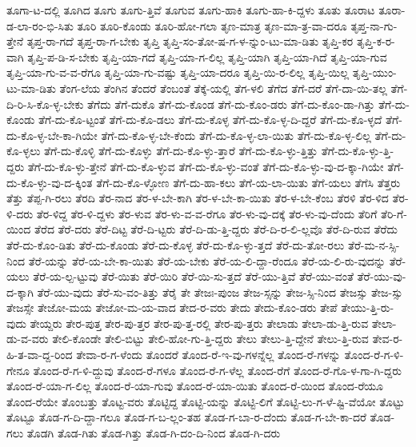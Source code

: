 {ತೂಗಾ-ಟ-ದಲ್ಲಿ
ತೂಗಿದ
ತೂಗು
ತೂಗು-ತ್ತಿವೆ
ತೂಗುವ
ತೂಗು-ಹಾಕಿ
ತೂಗು-ಹಾ-ಕಿ-ದ್ದಳು
ತೂತು
ತೂರಾಟ
ತೂರಾ-ಡ-ಲಾ-ರಂ-ಭಿ-ಸಿತು
ತೂರಿ
ತೂರಿ-ಕೊಂಡು
ತೂರಿ-ಹೋ-ಗಲಾ
ತೃಣ-ಮಾತ್ರ
ತೃಣ-ಮಾ-ತ್ರ-ವಾ-ದರೂ
ತೃಪ್ತ-ನಾ-ಗು-ತ್ತೇನೆ
ತೃಪ್ತ-ರಾ-ಗದೆ
ತೃಪ್ತ-ರಾ-ಗ-ಬೇಕು
ತೃಪ್ತಿ
ತೃಪ್ತಿ-ಸಂ-ತೋ-ಷ-ಗ-ಳ-ನ್ನುಂ-ಟು-ಮಾ-ಡಿತು
ತೃಪ್ತಿ-ಕರ
ತೃಪ್ತಿ-ಕ-ರ-ವಾಗಿ
ತೃಪ್ತಿ-ಪ-ಡಿ-ಸ-ಬೇಕು
ತೃಪ್ತಿ-ಯಾ-ಗದೆ
ತೃಪ್ತಿ-ಯಾ-ಗ-ಲಿಲ್ಲ
ತೃಪ್ತಿ-ಯಾಗಿ
ತೃಪ್ತಿ-ಯಾ-ಗಿದೆ
ತೃಪ್ತಿ-ಯಾ-ಗುವ
ತೃಪ್ತಿ-ಯಾ-ಗು-ವ-ವ-ರೆಗೂ
ತೃಪ್ತಿ-ಯಾ-ಗು-ವಷ್ಟು
ತೃಪ್ತಿ-ಯಾ-ದರೂ
ತೃಪ್ತಿ-ಯಿ-ರ-ಲಿಲ್ಲ
ತೃಪ್ತಿ-ಯಿಲ್ಲ
ತೃಪ್ತಿ-ಯುಂ-ಟು-ಮಾ-ಡಿತು
ತೆಂಗ-ಲೆಯ
ತೆಂಗಿನ
ತೆಂದರೆ
ತೆಂಬಂತೆ
ತೆಕ್ಕೆ-ಯಲ್ಲಿ
ತೆಗ-ಳಲಿ
ತೆಗೆದ
ತೆಗೆ-ದರೆ
ತೆಗೆ-ದಾ-ಯಿ-ತಲ್ಲ
ತೆಗೆ-ದಿ-ರಿ-ಸಿ-ಕೊ-ಳ್ಳ-ಬೇಕು
ತೆಗೆದು
ತೆಗೆ-ದುಕೊ
ತೆಗೆ-ದು-ಕೊಂಡ
ತೆಗೆ-ದು-ಕೊಂ-ಡರು
ತೆಗೆ-ದು-ಕೊಂ-ಡಾ-ಗಿತ್ತು
ತೆಗೆ-ದು-ಕೊಂಡು
ತೆಗೆ-ದು-ಕೊ-ಟ್ಟಂತೆ
ತೆಗೆ-ದು-ಕೊ-ಡಲು
ತೆಗೆ-ದು-ಕೊಳ್ಳ
ತೆಗೆ-ದು-ಕೊ-ಳ್ಳ-ದಿ-ದ್ದರೆ
ತೆಗೆ-ದು-ಕೊ-ಳ್ಳದೆ
ತೆಗೆ-ದು-ಕೊ-ಳ್ಳ-ಬೇ-ಕಾ-ಗಿಯೇ
ತೆಗೆ-ದು-ಕೊ-ಳ್ಳ-ಬೇ-ಕೆಂದು
ತೆಗೆ-ದು-ಕೊ-ಳ್ಳ-ಲಾ-ಯಿತು
ತೆಗೆ-ದು-ಕೊ-ಳ್ಳ-ಲಿಲ್ಲ
ತೆಗೆ-ದು-ಕೊ-ಳ್ಳಲು
ತೆಗೆ-ದು-ಕೊಳ್ಳಿ
ತೆಗೆ-ದು-ಕೊಳ್ಳು
ತೆಗೆ-ದು-ಕೊ-ಳ್ಳು-ತ್ತಾರೆ
ತೆಗೆ-ದು-ಕೊ-ಳ್ಳು-ತ್ತಿತ್ತು
ತೆಗೆ-ದು-ಕೊ-ಳ್ಳು-ತ್ತಿ-ದ್ದರು
ತೆಗೆ-ದು-ಕೊ-ಳ್ಳು-ತ್ತೇನೆ
ತೆಗೆ-ದು-ಕೊ-ಳ್ಳುವ
ತೆಗೆ-ದು-ಕೊ-ಳ್ಳು-ವಂತೆ
ತೆಗೆ-ದು-ಕೊ-ಳ್ಳು-ವು-ದ-ಕ್ಕಾ-ಗಿಯೇ
ತೆಗೆ-ದು-ಕೊ-ಳ್ಳು-ವು-ದ-ಕ್ಕಿಂತ
ತೆಗೆ-ದು-ಕೊ-ಳ್ಳೋಣ
ತೆಗೆ-ದು-ಹಾ-ಕಲು
ತೆಗೆ-ಯ-ಲಾ-ಯಿತು
ತೆಗೆ-ಯಲು
ತೆಗೆಸಿ
ತೆತ್ತರು
ತೆತ್ತು
ತೆಪ್ಪ-ಗಿ-ರಲು
ತೆರದಿ
ತೆರ-ನಾದ
ತೆರ-ಳ-ಬೇ-ಕಾಗಿ
ತೆರ-ಳ-ಬೇ-ಕಾ-ಯಿತು
ತೆರ-ಳ-ಬೇ-ಕೆಂಬ
ತೆರಳಿ
ತೆರ-ಳಿದ
ತೆರ-ಳಿ-ದರು
ತೆರ-ಳಿದ್ದ
ತೆರ-ಳಿ-ದ್ದಳು
ತೆರ-ಳುವ
ತೆರ-ಳು-ವ-ವ-ರೆಗೂ
ತೆರ-ಳು-ವು-ದಕ್ಕೆ
ತೆರ-ಳು-ವು-ದೆಂದು
ತೆರಿಗೆ
ತೆರಿ-ಗೆ-ಯಿಂದ
ತೆರೆದ
ತೆರೆ-ದರು
ತೆರೆ-ದಿಟ್ಟ
ತೆರೆ-ದಿ-ಟ್ಟರು
ತೆರೆ-ದಿ-ಡು-ತ್ತಿ-ದ್ದರು
ತೆರೆ-ದಿ-ರ-ಲಿ-ಲ್ಲವೊ
ತೆರೆ-ದಿ-ರುವ
ತೆರೆದು
ತೆರೆ-ದು-ಕೊಂ-ಡಿತು
ತೆರೆ-ದು-ಕೊಂಡು
ತೆರೆ-ದು-ಕೊಳ್ಳ
ತೆರೆ-ದು-ಕೊ-ಳ್ಳು-ತ್ತದೆ
ತೆರೆ-ದು-ತೋ-ರಲು
ತೆರೆ-ಮ-ನ-ಸ್ಸಿ-ನಿಂದ
ತೆರೆ-ಯನ್ನು
ತೆರೆ-ಯ-ಬೇ-ಕಾ-ಯಿತು
ತೆರೆ-ಯ-ಬೇಕು
ತೆರೆ-ಯ-ಲಿ-ದ್ದಾ-ರೆಂದೂ
ತೆರೆ-ಯ-ಲಿ-ರು-ವುದನ್ನು
ತೆರೆ-ಯಲು
ತೆರೆ-ಯ-ಲ್ಪ-ಟ್ಟುವು
ತೆರೆ-ಯಿತು
ತೆರೆ-ಯಿರಿ
ತೆರೆ-ಯಿ-ಸು-ತ್ತದೆ
ತೆರೆ-ಯು-ತ್ತಿವೆ
ತೆರೆ-ಯು-ವಂತೆ
ತೆರೆ-ಯು-ವು-ದ-ಕ್ಕಾಗಿ
ತೆರೆ-ಯು-ವುದು
ತೆರೆ-ಸು-ವಂ-ತಿತ್ತು
ತೆರೈ
ತೇ
ತೇಜಃ-ಪುಂಜ
ತೇಜ-ಸ್ಸನ್ನು
ತೇಜ-ಸ್ಸಿ-ನಿಂದ
ತೇಜಸ್ಸು
ತೇಜ-ಸ್ಸು
ತೇಜಸ್ಸೇ
ತೇಜೋ-ಮಯ
ತೇಜೋ-ಮ-ಯ-ವಾದ
ತೇದ-ರ-ವರು
ತೇದು
ತೇದು-ಕೊಂ-ಡರು
ತೇಪೆ
ತೇಯು-ತ್ತಿ-ರು-ವುದು
ತೇಯ್ದರು
ತೇರ-ಪುತ್ತ
ತೇರ-ಪು-ತ್ತರ
ತೇರ-ಪು-ತ್ತ-ರಲ್ಲಿ
ತೇರ-ಪು-ತ್ತರು
ತೇಲಾಡು
ತೇಲಾ-ಡು-ತ್ತಿ-ರುವ
ತೇಲಾ-ಡು-ವ-ವರು
ತೇಲಿ-ಕೊಂಡೇ
ತೇಲಿ-ಬಿಟ್ಟು
ತೇಲಿ-ಹೋ-ಗು-ತ್ತಿ-ದ್ದರು
ತೇಲು
ತೇಲು-ತ್ತಿ-ದ್ದೇನೆ
ತೇಲು-ತ್ತಿ-ರುವ
ತೇವ-ರ-ಹಿ-ತ-ವಾ-ದ್ದ-ರಿಂದ
ತೇವಾ-ರ-ಗ-ಳೆಂದು
ತೊಂದರೆ
ತೊಂದ-ರೆ-ಇ-ವು-ಗಳನ್ನೆಲ್ಲ
ತೊಂದ-ರೆ-ಗಳನ್ನು
ತೊಂದ-ರೆ-ಗ-ಳಿ-ಗೇನೂ
ತೊಂದ-ರೆ-ಗ-ಳಿ-ದ್ದುವು
ತೊಂದ-ರೆ-ಗಳೂ
ತೊಂದ-ರೆ-ಗ-ಳೆಲ್ಲ
ತೊಂದ-ರೆಗೆ
ತೊಂದ-ರೆ-ಗೊ-ಳ-ಗಾ-ಗಿ-ದ್ದರು
ತೊಂದ-ರೆ-ಯಾ-ಗ-ಲಿಲ್ಲ
ತೊಂದ-ರೆ-ಯಾ-ಗುವು
ತೊಂದ-ರೆ-ಯಾ-ಯಿತು
ತೊಂದ-ರೆ-ಯಿಂದ
ತೊಂದ-ರೆಯೂ
ತೊಂದ-ರೆಯೇ
ತೊಂಬತ್ತು
ತೊಟ್ಟ-ವರು
ತೊಟ್ಟಿದ್ದ
ತೊಟ್ಟಿ-ಯನ್ನು
ತೊಟ್ಟಿ-ಲಿಗೆ
ತೊಟ್ಟಿ-ಲು-ಗ-ಳೆ-ಷ್ಟಿ-ವೆಯೋ
ತೊಟ್ಟು
ತೊಟ್ಟೂ
ತೊಡ-ಗ-ದಿ-ದ್ದಾ-ಗಲೂ
ತೊಡ-ಗ-ಬ-ಲ್ಲಂ-ತಹ
ತೊಡ-ಗ-ಬಾ-ರ-ದೆಂದು
ತೊಡ-ಗ-ಬೇ-ಕಾ-ದರೆ
ತೊಡ-ಗಲು
ತೊಡಗಿ
ತೊಡ-ಗಿತು
ತೊಡ-ಗಿತ್ತು
ತೊಡ-ಗಿ-ದಂ-ದಿ-ನಿಂದ
ತೊಡ-ಗಿ-ದರು
}
